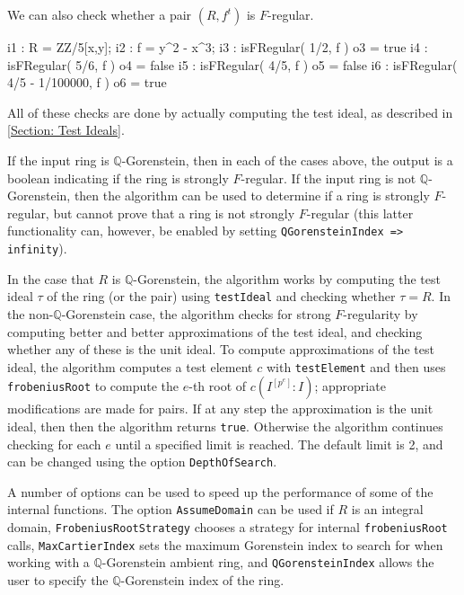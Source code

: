 \documentclass{amsart}
\begin{document}
We can also check whether a pair $(R, f^t)$ is $F$-regular.

\medskip
{\small
\begin{MyVerbatim}
i1 : R = ZZ/5[x,y];
i2 : f = y^2 - x^3;
i3 : isFRegular( 1/2, f )
o3 = true
i4 : isFRegular( 5/6, f )
o4 = false
i5 : isFRegular( 4/5, f )
o5 = false
i6 : isFRegular( 4/5 - 1/100000, f )
o6 = true
\end{MyVerbatim}
}\medskip

All of these checks are done by actually computing the test ideal, as described in \autoref{Section: Test Ideals}.

If the input ring is $\mathbb{Q}$-Gorenstein, then in each of the cases above, the output is a boolean indicating if the
ring is strongly $F$-regular. If the input ring is not
$\mathbb{Q}$-Gorenstein, then the algorithm can be used to determine if a
ring is strongly $F$-regular, but cannot prove that a ring is not strongly
$F$-regular (this latter functionality can, however, be enabled by setting \texttt{QGorensteinIndex => infinity}).


In the case that $R$ is $\mathbb{Q}$-Gorenstein, the algorithm works by
computing the test ideal $\tau$ of the ring  (or the pair) using \texttt{testIdeal}
and checking whether $\tau=R$.
In the non-$\mathbb{Q}$-Gorenstein case, the algorithm checks for
strong $F$-regularity by computing better and
better approximations of the test ideal, and checking whether any of these is the unit ideal.
To compute approximations of the
test ideal, the algorithm computes a test element $c$ with \texttt{testElement}
and then uses \texttt{frobeniusRoot} to compute the $e$-th root of
$c(I^{[p^{e}]} : I)$; appropriate modifications are made for pairs. If at
any step the approximation is the unit ideal, then then the algorithm
returns \texttt{true}. Otherwise the algorithm continues checking for each $e$
until a specified limit is reached. The default limit is 2, and can be
changed using the option \texttt{DepthOfSearch}.


A number of options can be used to speed up the performance of some of the
internal functions. The option \texttt{AssumeDomain} can be used if $R$ is an
integral domain, \texttt{FrobeniusRootStrategy} chooses a strategy for
internal \texttt{frobeniusRoot} calls, \texttt{MaxCartierIndex} sets the
maximum Gorenstein index to search for when working with a
$\mathbb{Q}$-Gorenstein ambient ring, and \texttt{QGorensteinIndex}
allows the user to specify the $\mathbb{Q}$-Gorenstein index of the ring.
\end{document}
